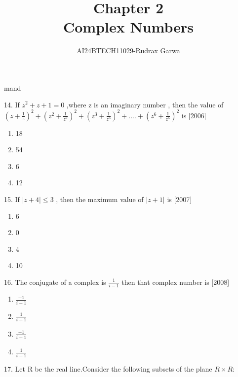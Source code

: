 \documentclass[journal,12pt,twocolumn]{IEEEtran}
\theoremstyle{remark}
\begin{document}

\vspace{3cm}

\title{Chapter 2 \\ Complex Numbers}
\author{AI24BTECH11029-Rudrax Garwa}
\maketitle
\newpage
\bigskip

\renewcom mand{\thefigure}{\theenumi}
\renewcommand{\thetable}{\theenumi}
\begin{ducument}
\item 14. If $z^2+z+1=0$ ,where z is an imaginary number , then the value of $\left(z+\frac{1}{z}\right)^2 + \left(z^2+\frac{1}{z^2}\right)^2 + \left(z^3 +\frac{1}{z^3}\right)^2 +....+\left(z^6 +\frac{1}{z^6}\right)^2$ is 
\hfill{\color{magenta}[2006]}
\begin{multicols}{4}
\begin{enumerate}
\item 18
\item 54
\item 6
\item 12
\end{enumerate}
\end{multicols}
\item 15. If $|z+4|\leq 3$ , then the maximum value of $|z+1|$ is
\hfill{\color{magenta}[2007]}
\begin{multicols}{4}
\begin{enumerate}
\item 6
\item 0
\item 4
\item 10
\end{enumerate}
\end{multicols}
\item 16. The conjugate of a complex is $\frac{1}{i-1}$ then that complex number is
\hfill{\color{magenta}[2008]}
\begin{multicols}{1}
\begin{enumerate}
\item $\frac{-1}{i-1}$
\item $\frac{1}{i+1}$
\item $\frac{-1}{i+1}$
\item $\frac{1}{i-1}$
\end{enumerate}
\end{multicols}
\item 17. Let R be the real line.Consider the following subsets of the plane $R×R$:

\end{ducument}
\end{document}
